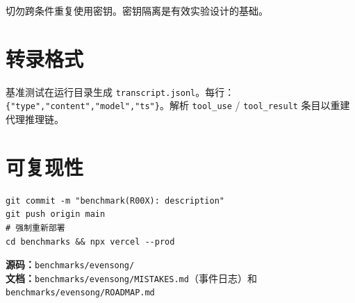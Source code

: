\documentclass[11pt,a4paper]{article}
\begin{document}
切勿跨条件重复使用密钥。密钥隔离是有效实验设计的基础。

\section{转录格式}

基准测试在运行目录生成 \texttt{transcript.jsonl}。每行：\texttt{\{"type","content","model","ts"\}}。解析 \texttt{tool\_use} / \texttt{tool\_result} 条目以重建代理推理链。

\section{可复现性}

\begin{verbatim}
git commit -m "benchmark(R00X): description"
git push origin main
# 强制重新部署
cd benchmarks && npx vercel --prod
\end{verbatim}

\vfill

\textbf{源码：}\texttt{benchmarks/evensong/}\\
\textbf{文档：}\texttt{benchmarks/evensong/MISTAKES.md}（事件日志）和 \texttt{benchmarks/evensong/ROADMAP.md}
\end{document}
